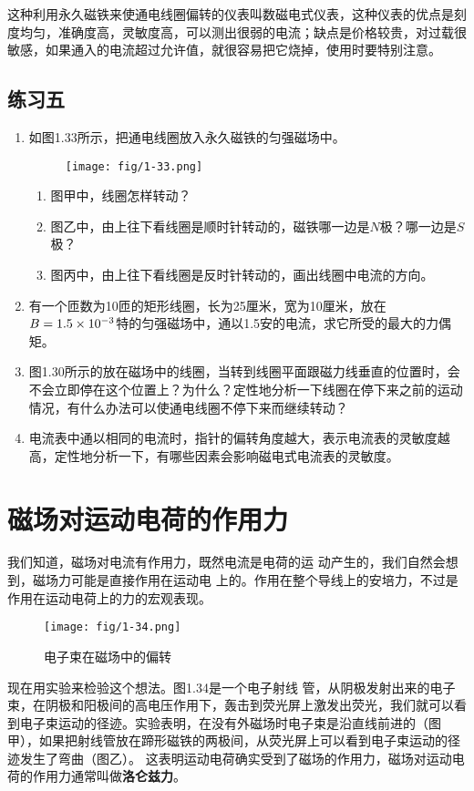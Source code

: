这种利用永久磁铁来使通电线圈偏转的仪表叫数磁电式仪表，这种仪表的优点是刻度均匀，准确度高，灵敏度高，可以测出很弱的电流；缺点是价格较贵，对过载很敏感，如果通入的电流超过允许值，就很容易把它烧掉，使用时要特别注意。

\subsection*{练习五}
\begin{enumerate}
    \item 如图1.33所示，把通电线圈放入永久磁铁的匀强磁场中。
    \begin{figure}[htp]\centering
    	\texttt{[image: fig/1-33.png]}
    	\caption{ }
    \end{figure}
    \begin{enumerate}
        \item 图甲中，线圈怎样转动？
        \item 图乙中，由上往下看线圈是顺时针转动的，磁铁哪一边是$N$极？哪一边是$S$极？
        \item 图丙中，由上往下看线圈是反时针转动的，画出线圈中电流的方向。
    \end{enumerate}
    \item 有一个匝数为10匝的矩形线圈，长为25厘米，宽为10厘米，放在$B=1.5\times10^{-3}$特的匀强磁场中，通以1.5安的电流，求它所受的最大的力偶矩。
    \item 图1.30所示的放在磁场中的线圈，当转到线圈平面跟磁力线垂直的位置时，会不会立即停在这个位置上？为什么？定性地分析一下线圈在停下来之前的运动情况，有什么办法可以使通电线圈不停下来而继续转动？
    \item 电流表中通以相同的电流时，指针的偏转角度越大，表示电流表的灵敏度越高，定性地分析一下，有哪些因素会影响磁电式电流表的灵敏度。
\end{enumerate}


\section{磁场对运动电荷的作用力}
我们知道，磁场对电流有作用力，既然电流是电荷的运
动产生的，我们自然会想到，磁场力可能是直接作用在运动电
上的。作用在整个导线上的安培力，不过是作用在运动电荷上的力的宏观表现。
\begin{figure}[htp]\centering
	\texttt{[image: fig/1-34.png]}
	\caption{电子束在磁场中的偏转}
\end{figure}

现在用实验来检验这个想法。图1.34是一个电子射线
管，从阴极发射出来的电子束，在阴极和阳极间的高电压作用下，轰击到荧光屏上激发出荧光，我们就可以看到电子束运动的径迹。实验表明，在没有外磁场时电子束是沿直线前进的（图甲），如果把射线管放在蹄形磁铁的两极间，从荧光屏上可以看到电子束运动的径迹发生了弯曲（图乙）。 这表明运动电荷确实受到了磁场的作用力，磁场对运动电荷的作用力通常叫做\textbf{洛仑兹力}。

